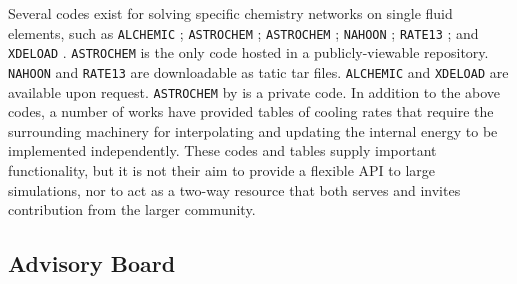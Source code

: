Several codes exist for solving specific chemistry
networks on single fluid elements, such as 
\texttt{ALCHEMIC} \citep{2010A&A...522A..42S}; \texttt{ASTROCHEM}
\citep{2013MNRAS.431..455K}; \texttt{ASTROCHEM} \citep[][unrelated to
the first \texttt{ASTROCHEM}]{2013A&A...559A..53M}; \texttt{NAHOON}
\citep{2012ApJS..199...21W}; \texttt{RATE13} \citep[associated with
  the UMIST database][]{2013A&A...550A..36M}; and \texttt{XDELOAD}
\citep{2005Ap&SS.299....1N}.  \texttt{ASTROCHEM}
\citep{2013A&A...559A..53M} is the only code hosted in a
publicly-viewable repository.  \texttt{NAHOON} and \texttt{RATE13} are
downloadable as tatic tar files.  \texttt{ALCHEMIC} and
\texttt{XDELOAD} are available upon request.  \texttt{ASTROCHEM} by
\citet{2013MNRAS.431..455K} is a private code.
In addition to the above codes, a number of works have provided tables
of cooling rates \citep{1993ApJS...88..253S, 2009MNRAS.393...99W,
2013MNRAS.434.1043O} that require the surrounding machinery for
interpolating and updating the internal energy to be implemented
independently.
These codes and tables supply important functionality, but it is
not their aim to provide a flexible API to large simulations, nor to
act as a two-way resource that both serves and invites contribution
from the larger community.


\subsection{Advisory Board}

